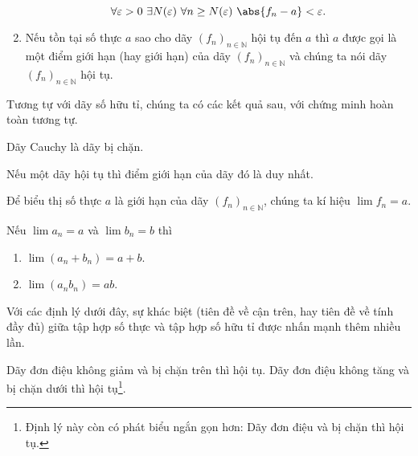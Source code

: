 \begin{definition}
\begin{enumerate}[label={(\roman*)}]
              \[
                  \forall \varepsilon > 0\ \exists N(\varepsilon)\ \forall n\geq N(\varepsilon)\ \abs{f_{n} - a} < \varepsilon.
              \]
        \item Nếu tồn tại số thực $a$ sao cho dãy ${(f_{n})}_{n\in\mathbb{N}}$ hội tụ đến $a$ thì $a$ được gọi là một điểm giới hạn (hay giới hạn) của  dãy ${(f_{n})}_{n\in\mathbb{N}}$ và chúng ta nói dãy ${(f_{n})}_{n\in\mathbb{N}}$ hội tụ.
    \end{enumerate}
\end{definition}

Tương tự với dãy số hữu tỉ, chúng ta có các kết quả sau, với chứng minh hoàn toàn tương tự.
\begin{theorem}
    Dãy Cauchy là dãy bị chặn.
\end{theorem}

\begin{theorem}
    Nếu một dãy hội tụ thì điểm giới hạn của dãy đó là duy nhất.
\end{theorem}

Để biểu thị số thực $a$ là giới hạn của dãy ${(f_{n})}_{n\in\mathbb{N}}$, chúng ta kí hiệu $\lim f_{n} = a$.

\begin{theorem}\label{theorem:limits-of-sum-and-product-of-sequences}
    Nếu $\lim a_{n} = a$ và $\lim b_{n} = b$ thì
    \begin{enumerate}[label={(\roman*)}]
        \item $\lim (a_{n} + b_{n}) = a + b$.
        \item $\lim (a_{n}b_{n}) = ab$.
    \end{enumerate}
\end{theorem}

Với các định lý dưới đây, sự khác biệt (tiên đề về cận trên, hay tiên đề về tính đầy đủ) giữa tập hợp số thực và tập hợp số hữu tỉ được nhấn mạnh thêm nhiều lần.

\begin{theorem}
    Dãy đơn điệu không giảm và bị chặn trên thì hội tụ. Dãy đơn điệu không tăng và bị chặn dưới thì hội tụ\footnote{Định lý này còn có phát biểu ngắn gọn hơn: Dãy đơn điệu và bị chặn thì hội tụ.}.
\end{theorem}

